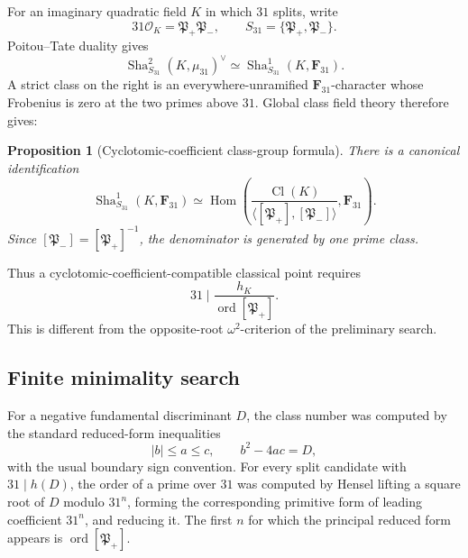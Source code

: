 \documentclass[11pt]{article}
\newtheorem{proposition}[theorem]{Proposition}
\theoremstyle{remark}
\providecommand{\Sha}{\operatorname{Sha}}
\begin{document}
For an imaginary quadratic field \(K\) in which \(31\) splits,
write
\[
 31\mathcal O_K=\mathfrak P_+\mathfrak P_-,
 \qquad
 S_{31}=\{\mathfrak P_+,\mathfrak P_-\}.
\]
Poitou--Tate duality gives
\[
 \Sha^2_{S_{31}}(K,\mu_{31})^\vee
 \simeq
 \Sha^1_{S_{31}}(K,\mathbf F_{31}).
\]
A strict class on the right is an everywhere-unramified
\(\mathbf F_{31}\)-character whose Frobenius is zero at the two primes
above \(31\).  Global class field theory therefore gives:

\begin{proposition}[Cyclotomic-coefficient class-group formula]
\label{prop:v073-root-classgroup-formula}
There is a canonical identification
\begin{equation}
 \boxed{
 \Sha^1_{S_{31}}(K,\mathbf F_{31})
 \simeq
 \operatorname{Hom}\!\left(
 \frac{\operatorname{Cl}(K)}
 {\langle[\mathfrak P_+],[\mathfrak P_-]\rangle},
 \mathbf F_{31}
 \right).}
 \label{eq:v073-root-classgroup-formula}
\end{equation}
Since
\(
[\mathfrak P_-]=[\mathfrak P_+]^{-1}
\),
the denominator is generated by one prime class.
\end{proposition}

Thus a cyclotomic-coefficient-compatible classical point requires
\begin{equation}
 \boxed{
 31\mid
 \frac{h_K}{\operatorname{ord}[\mathfrak P_+]}.}
 \label{eq:v073-root-point-criterion}
\end{equation}
This is different from the opposite-root \(\omega^2\)-criterion of
the preliminary search.


\subsection{Finite minimality search}

For a negative fundamental discriminant \(D\), the class number was computed
by the standard reduced-form inequalities
\[
 |b|\le a\le c,\qquad b^2-4ac=D,
\]
with the usual boundary sign convention.  For every split candidate with
\(31\mid h(D)\), the order of a prime over \(31\) was computed by Hensel
lifting a square root of \(D\) modulo \(31^n\), forming the corresponding
primitive form of leading coefficient \(31^n\), and reducing it.  The first
\(n\) for which the principal reduced form appears is
\(\operatorname{ord}[\mathfrak P_+]\).
\end{document}
